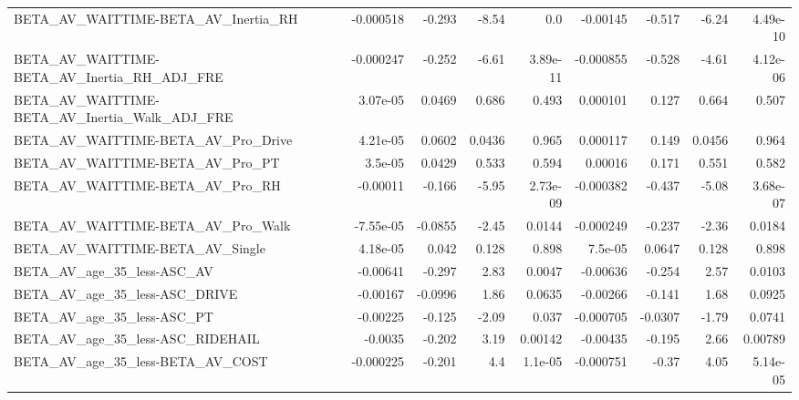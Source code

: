 \begin{tabular}{lrrrrrrrr}
BETA\_AV\_WAITTIME-BETA\_AV\_Inertia\_RH                &   -0.000518 &       -0.293 &    -8.54 &      0.0 &   -0.00145 &      -0.517 &        -6.24 &      4.49e-10 \\
BETA\_AV\_WAITTIME-BETA\_AV\_Inertia\_RH\_ADJ\_FRE        &   -0.000247 &       -0.252 &    -6.61 & 3.89e-11 &  -0.000855 &      -0.528 &        -4.61 &      4.12e-06 \\
BETA\_AV\_WAITTIME-BETA\_AV\_Inertia\_Walk\_ADJ\_FRE      &    3.07e-05 &       0.0469 &    0.686 &    0.493 &   0.000101 &       0.127 &        0.664 &         0.507 \\
BETA\_AV\_WAITTIME-BETA\_AV\_Pro\_Drive                 &    4.21e-05 &       0.0602 &   0.0436 &    0.965 &   0.000117 &       0.149 &       0.0456 &         0.964 \\
BETA\_AV\_WAITTIME-BETA\_AV\_Pro\_PT                    &     3.5e-05 &       0.0429 &    0.533 &    0.594 &    0.00016 &       0.171 &        0.551 &         0.582 \\
BETA\_AV\_WAITTIME-BETA\_AV\_Pro\_RH                    &    -0.00011 &       -0.166 &    -5.95 & 2.73e-09 &  -0.000382 &      -0.437 &        -5.08 &      3.68e-07 \\
BETA\_AV\_WAITTIME-BETA\_AV\_Pro\_Walk                  &   -7.55e-05 &      -0.0855 &    -2.45 &   0.0144 &  -0.000249 &      -0.237 &        -2.36 &        0.0184 \\
BETA\_AV\_WAITTIME-BETA\_AV\_Single                    &    4.18e-05 &        0.042 &    0.128 &    0.898 &    7.5e-05 &      0.0647 &        0.128 &         0.898 \\
BETA\_AV\_age\_35\_less-ASC\_AV                         &    -0.00641 &       -0.297 &     2.83 &   0.0047 &   -0.00636 &      -0.254 &         2.57 &        0.0103 \\
BETA\_AV\_age\_35\_less-ASC\_DRIVE                      &    -0.00167 &      -0.0996 &     1.86 &   0.0635 &   -0.00266 &      -0.141 &         1.68 &        0.0925 \\
BETA\_AV\_age\_35\_less-ASC\_PT                         &    -0.00225 &       -0.125 &    -2.09 &    0.037 &  -0.000705 &     -0.0307 &        -1.79 &        0.0741 \\
BETA\_AV\_age\_35\_less-ASC\_RIDEHAIL                   &     -0.0035 &       -0.202 &     3.19 &  0.00142 &   -0.00435 &      -0.195 &         2.66 &       0.00789 \\
BETA\_AV\_age\_35\_less-BETA\_AV\_COST                   &   -0.000225 &       -0.201 &      4.4 &  1.1e-05 &  -0.000751 &       -0.37 &         4.05 &      5.14e-05 \\

\end{tabular}
